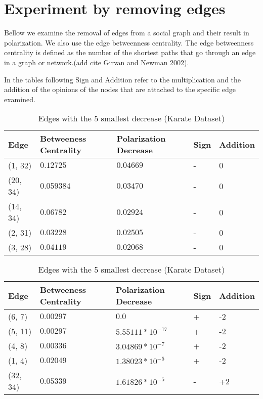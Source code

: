 \section{Experiment by removing edges}
\label{sec:properties}
Bellow we examine the removal of edges from a social graph and their result in polarization. We also use the edge betweenness centrality. The edge betweenness centrality is defined as the number of the shortest paths that go through an edge in a graph or network.(add cite Girvan and Newman 2002). 

In the tables following Sign and Addition refer to the multiplication and the addition of the opinions of the nodes that are attached to the specific edge examined. 
\\

\begin{table}[htbp]
 \centering
 \caption{Edges with the 5 largest decrease (Karate Dataset)}
 \label{tab:edgesLargest}
 \begin{tabular}{| l || l | l | l | l |}
 \hline
  Edge & Betweeness Centrality & Polarization Decrease & Sign & Addition\\
  \hline
  \hline
  (1, 32) & $0.12725$ & $0.04669$ & - &  0\\
  \hline
  (20, 34) & $0.059384$ & $0.03470$ & - &  0\\
  \hline
  (14, 34) & $0.06782$ & $0.02924$ & - &  0\\
  \hline
  (2, 31) & $0.03228$ & $0.02505$ & - &  0\\
  \hline
  (3, 28) & $0.04119$ & $0.02068$ & - &  0\\
  \hline
 \end{tabular}
  
 \caption{Edges with the 5 smallest decrease (Karate Dataset)}
 \label{tab:edgesLargest}
 \begin{tabular}{| l || l | l | l | l |}
 \hline
  Edge & Betweeness Centrality & Polarization Decrease & Sign & Addition\\
  \hline
  \hline
  (6, 7) & $0.00297$ & $0.0$ & + &  -2\\
  \hline
  (5, 11) & $0.00297$ & $5.55111*10^{-17}$ & + &  -2\\
  \hline
  (4, 8) & $0.00336$ & $3.04869*10^{-7}$ & + &  -2\\
  \hline
  (1, 4) & $0.02049$ & $1.38023*10^{-5}$ & + &  -2\\
  \hline
  (32, 34) & $0.05339$ & $1.61826*10^{-5}$ & - &  +2\\
  \hline
  \hline
 \end{tabular}
 
\end{table}

